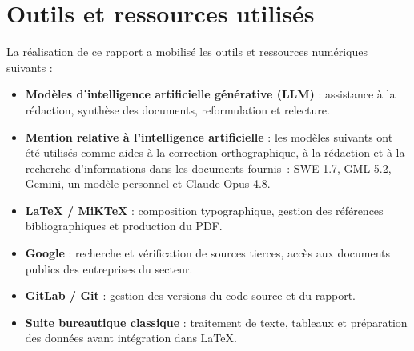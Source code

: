 \documentclass[12pt,a4paper]{article}
\begin{document}

\newpage

\nocite{un_global_compact,b4si_framework,ghg_protocol,volvo_green_it_2026,daimler_esg_2025,scania_it_green_2025}
\printbibliography[keyword=interne,heading=subbibliography,title={Documents internes Iveco Group}]
\printbibliography[keyword=externe,heading=subbibliography,title={Références normatives et cadres sectoriels}]
\newpage

\section*{Outils et ressources utilisés}

La réalisation de ce rapport a mobilisé les outils et ressources numériques suivants :

\begin{itemize}
    \item \textbf{Modèles d'intelligence artificielle générative (LLM)} : assistance à la rédaction, synthèse des documents, reformulation et relecture.
    \item \textbf{Mention relative à l'intelligence artificielle} : les modèles suivants ont été utilisés comme aides à la correction orthographique, à la rédaction et à la recherche d'informations dans les documents fournis~: SWE-1.7, GML 5.2, Gemini, un modèle personnel et Claude Opus 4.8.
    \item \textbf{\LaTeX{} / MiKTeX} : composition typographique, gestion des références bibliographiques et production du PDF.
    \item \textbf{Google} : recherche et vérification de sources tierces, accès aux documents publics des entreprises du secteur.
    \item \textbf{GitLab / Git} : gestion des versions du code source et du rapport.
    \item \textbf{Suite bureautique classique} : traitement de texte, tableaux et préparation des données avant intégration dans \LaTeX{}.
\end{itemize}
\newpage


\end{document}
